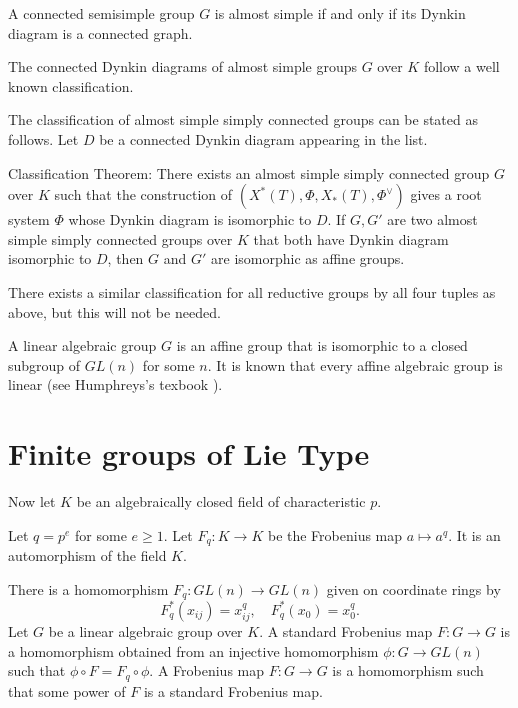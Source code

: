 A connected semisimple group $G$ is almost simple if and only if
its Dynkin diagram is a connected graph.

The connected Dynkin diagrams of almost simple groups $G$ over $K$
follow a well known classification.


The classification of almost simple simply connected groups
can be stated as follows.
Let $D$ be a connected Dynkin diagram appearing in the list.

Classification Theorem: There exists an almost simple simply connected
group $G$ over $K$ such that the construction of
$(X^*(T),\Phi,X_*(T),\Phi^\vee)$ gives a root system $\Phi$ whose
Dynkin diagram is isomorphic to $D$.  If $G,G'$ are two almost simple
simply connected groups over $K$ that both have Dynkin diagram
isomorphic to $D$, then $G$ and $G'$ are isomorphic as affine groups.

There exists a similar classification for all reductive groups by all
four tuples as above, but this will not be needed.

A linear algebraic group $G$ is an affine group that is isomorphic to
a closed subgroup of $GL(n)$ for some $n$. It is known that every
affine algebraic group is linear (see Humphreys's texbook
\cite{humphreys2012linear}).

\section{Finite groups of Lie Type}

Now let $K$ be an algebraically closed field of characteristic $p$.

Let $q = p^e$ for some $e\ge 1$.  Let $F_q:K\to K$ be the
Frobenius map $a\mapsto a^q$. It is an automorphism of the field $K$.

There is a homomorphism $F_q:GL(n)\to GL(n)$ given on coordinate rings
by
\[
F_q^*(x_{ij}) = x_{ij}^q,\quad F_q^*(x_0) = x_0^q.
\]
Let $G$ be a linear algebraic group over $K$.  A standard Frobenius
map $F:G\to G$ is a homomorphism obtained from an injective
homomorphism $\phi:G\to GL(n)$ such that $\phi\circ F = F_q \circ
\phi$.  A Frobenius map $F:G\to G$ is a homomorphism such that some
power of $F$ is a standard Frobenius map.


